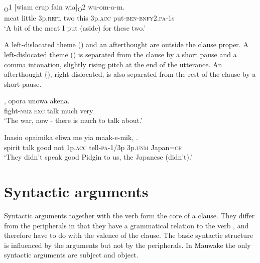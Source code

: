 \ea%
\label{ex:x930}
\textsubscript{O}1  [wiam  erup  fain  wia]\textsubscript{O}2 wu-om-a-m. \\
     meat  little  3p.\textsc{refl}  two  this  3p.\textsc{acc} put-\textsc{ben}-\textsc{bnfy}2.\textsc{pa}-1s \\
\glt `A bit of the meat I put (aside) for these two.'
\z

A left-dislocated theme () and an afterthought are outside the clause proper.  A left-dislocated theme () is separated from the clause by a short pause and a comma intonation, slightly rising pitch at the end of the utterance.  An afterthought (), right-dislocated, is also separated from the rest of the clause by a short pause.

\ea%
\label{ex:x935}
\gll {},  opora  unowa  akena. \\
     fight-\textsc{nmz}  \textsc{exc}  talk  much  very \\
\glt `The war, now - there is much to talk about.'
\z

\ea%
\label{ex:x929}
\gll Inasin  opaimika  eliwa  me  yia  maak-e-mik,   . \\
     spirit  talk  good  not  1p.\textsc{acc}  tell-\textsc{pa}-1/3p  3p.\textsc{unm} Japan=\textsc{cf} \\
\glt `They didn't speak good Pidgin to us, the Japanese (didn't).'
\z

\section{Syntactic arguments}
{}
Syntactic arguments together with the verb form the core of a clause. They differ from the peripherals in that they have a grammatical relation to the verb \citep[][77--80]{FoleyEtAl1984}, and therefore have to do with the valence of the clause. The basic syntactic structure is influenced by the arguments but not by the peripherals.  In Mauwake the only syntactic arguments are subject and object. 

